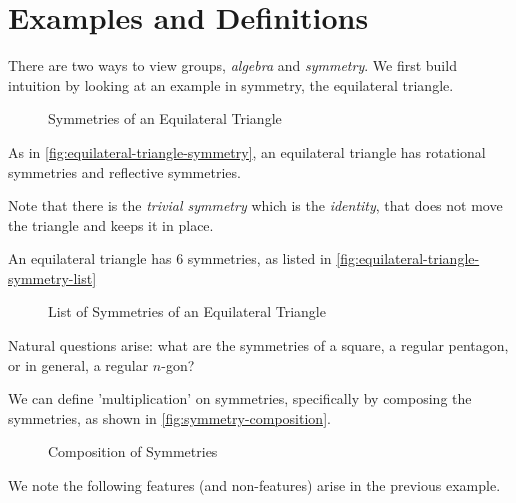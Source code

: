 \section{Examples and Definitions}
\label{sec:examples-and-definitions}

There are two ways to view groups, \emph{algebra} and \emph{symmetry}. We first build intuition by looking at an example in symmetry, the equilateral triangle.

\begin{figure}[ht!]
    \centering
    
    \caption{Symmetries of an Equilateral Triangle}
    \label{fig:equilateral-triangle-symmetry}
\end{figure}

\begin{example}
    As in \autoref{fig:equilateral-triangle-symmetry}, an equilateral triangle has rotational symmetries and reflective symmetries.
    
    Note that there is the \emph{trivial symmetry} which is the \emph{identity}, that does not move the triangle and keeps it in place.

    An equilateral triangle has 6 symmetries, as listed in \autoref{fig:equilateral-triangle-symmetry-list}
\end{example}

\begin{figure}[ht!]
    \centering
    \caption{List of Symmetries of an Equilateral Triangle}
    \label{fig:equilateral-triangle-symmetry-list}
\end{figure}

Natural questions arise: what are the symmetries of a square, a regular pentagon, or in general, a regular \(n\)-gon?

We can define 'multiplication' on symmetries, specifically by composing the symmetries, as shown in \autoref{fig:symmetry-composition}.

\begin{figure}[ht!]
    \centering
    \caption{Composition of Symmetries}
    \label{fig:symmetry-composition}
\end{figure}

We note the following features (and non-features) arise in the previous example. \bigbreak

